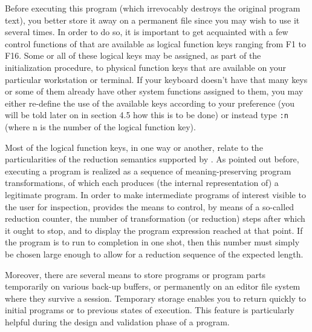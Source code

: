 Before executing this program (which irrevocably destroys the original program text),
 you better store it away on a permanent file since you may wish to use it several times.
In order to do so, it is important to get acquainted with
a few {\mys control functions} of \pired that are available
as {\mys logical function keys}
ranging from F1 to F16. Some or all of these logical keys may be 
assigned, as part of the \pired initialization procedure,
 to {\mys physical function keys} that are available on
your particular workstation or terminal. If your keyboard doesn't
 have that many keys
or some of them already have other system functions assigned to them,
you may either re-define the use of the available keys according to your
preference (you will be told later on in section 4.5 
how this is to be done) or instead type
{\tt :n} (where n is the number of the logical function key).

Most of the logical function keys, in one way or another, relate to the particularities
 of the reduction semantics supported by \pired. As pointed out before,
executing a program is realized as a sequence of meaning-preserving
 program transformations,
of which each produces (the internal representation of) 
a legitimate \kir program. In order to make intermediate programs
of interest visible to the user for inspection,
\pired provides the means to control, by means of a so-called {\mys reduction counter},
the number of transformation (or reduction) steps after which it ought to stop,
 and to display the program expression reached at that point. If the program
is to run to completion in one shot, then this number must simply be chosen
 large enough to allow for a reduction sequence of the expected length. 

Moreover, there are several means to {\mys store programs} or program parts 
temporarily
on various {\mys back-up buffers}, or permanently on an {\mys editor file system}
where they survive a \pired session. Temporary storage
enables you to return quickly to initial programs or to previous states of
execution. This feature is particularly helpful during the design and validation phase of a program.

